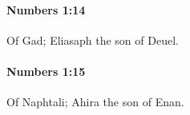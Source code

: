 		\paragraph{Numbers 1:14} %
			\label{NUMBERS-1-14}

			Of Gad; Eliasaph the son of Deuel.


		\paragraph{Numbers 1:15} %
			\label{NUMBERS-1-15}

			Of Naphtali; Ahira the son of Enan.


